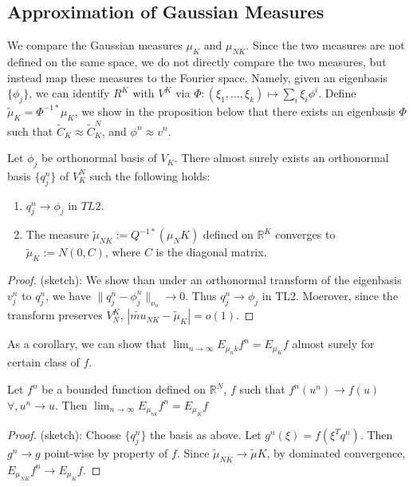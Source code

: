 \documentclass[final]{siamart0516}
\begin{document}
 
\subsection{Approximation of Gaussian Measures} 
We compare the Gaussian measures $\mu_K$ and $\mu_{NK}$. Since the two measures are not defined on the same space, we do not directly compare the two measures, but instead map these measures to the Fourier space. Namely, given an eigenbasis $\{\phi_j\}$, we can identify $R^K$ with $V^K$ via $\Phi: (\xi_1, \dots, \xi_k) \mapsto \sum_i \xi_i \phi^i$. Define $\tilde{\mu}_K = \Phi^{-1*} \mu_K$, we show in the proposition below that there exists an eigenbasis $\Phi$ such that $\tilde{C}_K \approx \tilde{C}_K^N$, and $\phi^n \approx v^n$.  

\begin{proposition}
Let $\phi_j$ be orthonormal basis of $V_K$. There almost surely exists an orthonormal basis $\{q^n_j\}$ of $V^N_K$ such the following holds: 
\begin{enumerate}
\item $q^n_j \rightarrow \phi_j$ in $TL2$. 
\item The measure $\tilde{\mu}_{NK} := Q^{-1*}(\mu_NK)$ defined on $\mathbb{R}^K$ converges to $\tilde{\mu}_{K} := N(0, C)$, where $C$ is the diagonal matrix. 
\end{enumerate}
\end{proposition}
\begin{proof}
(sketch): We show than under an orthonormal transform of the eigenbasis $v^n_j$ to $q^n_j$, we have $\|q^n_j - \phi^n_j\|_{\nu_n}\rightarrow 0$. Thus $q^n_j \rightarrow \phi_j$ in TL2. Moerover, since the transform preserves $V^K_N$, $|\tilde{mu}_{NK} - \tilde{\mu}_K| = o(1)$. 
\end{proof}
As a corollary, we can show that $\lim_{n\rightarrow \infty}E_{\mu_nk} f^n = E_{\mu_K} f$ almost surely for certain class of $f$. 
\begin{corollary}
Let $f^n$ be a bounded function defined on $\mathbb{R}^N$, $f$ such that $f^n(u^n) \rightarrow f(u)$ $\forall, u^n \rightarrow u$. Then $\lim_{n\rightarrow \infty}E_{\mu_{nk}} f^n = E_{\mu_K} f$
\end{corollary}
\begin{proof}
(sketch): Choose $\{q^n_j\}$ the basis as above. Let $g^n(\xi) = f(\xi^Tq^n)$. Then $g^n \rightarrow g$ point-wise by property of $f$. Since $\tilde{\mu}_{NK} \rightarrow \tilde{\mu}{K}$, by dominated convergence, $E_{\mu_{NK}}f^n \rightarrow E_{\mu_K} f$. 
\end{proof}
\end{document}
